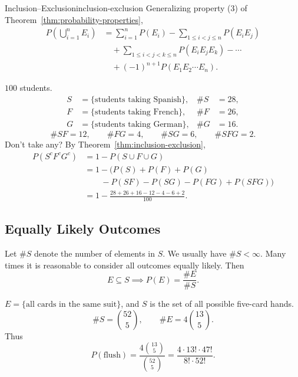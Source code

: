 \begin{theorem}{Inclusion--Exclusion}{inclusion-exclusion}
  Generalizing property (3) of Theorem~\ref{thm:probability-properties},
  \begin{align*}
    P\left(\bigcup_{i=1}^n E_i\right)
     & =\sum_{i=1}^n P(E_i)-\sum_{1\le i<j\le n}P(E_iE_j) \\
     & \quad+\sum_{1\le i<j<k\le n}P(E_iE_jE_k)-\cdots    \\
     & \quad+(-1)^{n+1}P(E_1E_2\cdots E_n).
  \end{align*}
\end{theorem}

\begin{example}
  $100$ students.
  \begin{align*}
    S & =\{\text{students taking Spanish}\}, & \#S & =28, \\
    F & =\{\text{students taking French}\},  & \#F & =26, \\
    G & =\{\text{students taking German}\},  & \#G & =16.
  \end{align*}
  \[
    \#SF=12,\qquad \#FG=4,\qquad \#SG=6,\qquad \#SFG=2.
  \]
  Don't take any? By Theorem~\ref{thm:inclusion-exclusion},
  \begin{align*}
    P(S^cF^cG^c) & =1-P(S\cup F\cup G)                   \\
                 & =1-\bigl(P(S)+P(F)+P(G)               \\
                 & \qquad-P(SF)-P(SG)-P(FG)+P(SFG)\bigr) \\
                 & =1-\frac{28+26+16-12-4-6+2}{100}.
  \end{align*}
\end{example}

\subsection{Equally Likely Outcomes}

Let $\#S$ denote the number of elements in $S$. We usually have $\#S<\infty$.
Many times it is reasonable to consider all outcomes equally likely. Then
\[
  E\subseteq S\implies P(E)=\frac{\#E}{\#S}.
\]

\begin{example}
  $E=\{\text{all cards in the same suit}\}$, and $S$ is the set of all possible five-card hands.
  \[
    \#S=\binom{52}{5},\qquad \#E=4\binom{13}{5}.
  \]
  Thus
  \[
    P(\text{flush})=\frac{4\binom{13}{5}}{\binom{52}{5}}
    =\frac{4\cdot13!\cdot47!}{8!\cdot52!}.
  \]
\end{example}

